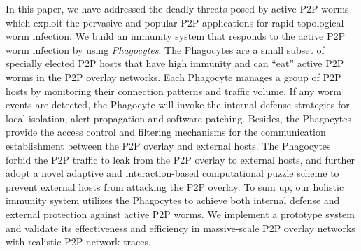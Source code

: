 \documentclass[times,10pt,twocolumn]{article}
\begin{document}
In this paper, we have addressed the deadly threats posed by active
P2P worms which exploit the pervasive and popular P2P applications
for rapid topological worm infection. We build an immunity system
that responds to the active P2P worm infection by using
\emph{Phagocytes}. The Phagocytes are a small subset of specially
elected P2P hosts that have high immunity and can ``eat'' active P2P
worms in the P2P overlay networks. Each Phagocyte manages a group of
P2P hosts by monitoring their connection patterns and traffic
volume. If any worm events are detected, the Phagocyte will invoke
the internal defense strategies for local isolation, alert
propagation and software patching. Besides, the Phagocytes provide
the access control and filtering mechanisms for the communication
establishment between the P2P overlay and external hosts. The
Phagocytes forbid the P2P traffic to leak from the P2P overlay to
external hosts, and further adopt a novel adaptive and
interaction-based computational puzzle scheme to prevent external
hosts from attacking the P2P overlay. To sum up, our holistic
immunity system utilizes the Phagocytes to achieve both internal
defense and external protection against active P2P worms. We
implement a prototype system and validate its effectiveness and
efficiency in massive-scale P2P overlay networks with realistic P2P
network traces.











\footnotesize{

}
\end{document}

